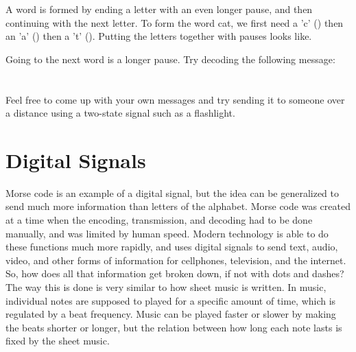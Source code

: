 \begin{center}\end{center}

A word is formed by ending a letter with an even longer pause, and then continuing with the next letter. To form the word cat, we first need a 'c' (\mdah\mdit\mdah\mdit) then an 'a' (\mdit\mdah) then a 't' (\mdah). Putting the letters together with pauses looks like.

\begin{center}
	\mdah\mdit\mdah\mdit\mlet\mdit\mdah\mlet\mdah
\end{center}

Going to the next word is a longer pause. Try decoding the following message: \mdit\mdit\mlet\mdah\mdit\mword
\mdah\mlet\mdit\mlet\mdit\mdah\mlet\mdah\mdit\mdah\mdit\mlet\mdit\mdit\mdit\mdit\mlet\mdit\mdit\mlet\mdah\mdit\mlet\mdah\mdah\mdit\mword \\
\mdah\mdah\mdah\mlet\mdah\mlet\mdit\mdit\mdit\mdit\mlet\mdit\mlet\mdit\mdah\mdit\mlet\mdit\mdit\mdit\mword
\mdit\mdah\mdah\mlet\mdit\mword
\mdah\mlet\mdit\mlet\mdit\mdah\mlet\mdah\mdit\mdah\mdit\mlet\mdit\mdit\mdit\mdit\mword\\
\mdah\mdah\mdah\mlet\mdit\mdit\mdah\mlet\mdit\mdah\mdit\mlet\mdit\mdit\mdit\mlet\mdit\mlet\mdit\mdah\mdit\mdit\mlet\mdit\mdit\mdit\mdah\mlet\mdit\mlet\mdit\mdit\mdit\\

Feel free to come up with your own messages and try sending it to someone over a distance using a two-state signal such as a flashlight.

\section{Digital Signals}


Morse code is an example of a digital signal, but the idea can be generalized to send much more information than letters of the alphabet. Morse code was created at a time when the encoding, transmission, and decoding had to be done manually, and was limited by human speed. Modern technology is able to do these functions much more rapidly, and uses digital signals to send text, audio, video, and other forms of information for cellphones, television, and the internet. So, how does all that information get broken down, if not with dots and dashes?\\

The way this is done is very similar to how sheet music is written. In music, individual notes are supposed to played for a specific amount of time, which is regulated by a beat frequency. Music can be played faster or slower by making the beats shorter or longer, but the relation between how long each note lasts is fixed by the sheet music.\\

